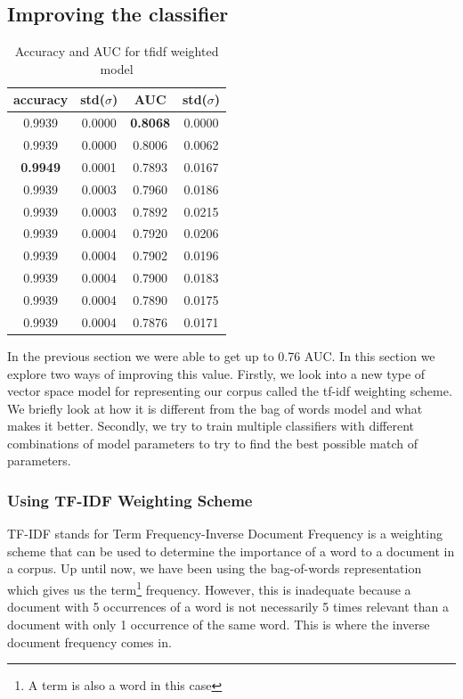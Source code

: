 \subsection{Improving the classifier}

\begin{table}
  \centering
  \begin{tabular}{cccc} \toprule
    accuracy        & std($\sigma$) & AUC             & std($\sigma$) \\ \midrule
    0.9939          & 0.0000        & \textbf{0.8068} & 0.0000 \\
    0.9939          & 0.0000        & 0.8006          & 0.0062 \\
    \textbf{0.9949} & 0.0001        & 0.7893          & 0.0167 \\
    0.9939          & 0.0003        & 0.7960          & 0.0186 \\
    0.9939          & 0.0003        & 0.7892          & 0.0215 \\ \midrule
    0.9939          & 0.0004        & 0.7920          & 0.0206 \\
    0.9939          & 0.0004        & 0.7902          & 0.0196 \\
    0.9939          & 0.0004        & 0.7900          & 0.0183 \\
    0.9939          & 0.0004        & 0.7890          & 0.0175 \\
    0.9939          & 0.0004        & 0.7876          & 0.0171 \\ \bottomrule
  \end{tabular}
    \caption{Accuracy and AUC for tfidf weighted model}
    \label{tab:tfidf-model-table}
\end{table}

In the previous section we were able to get up to 0.76 AUC\@. In this section we explore two ways of
improving this value. Firstly, we look into a new type of vector space model for representing our
corpus called the tf-idf weighting scheme. We briefly look at how it is different from the bag of
words model and what makes it better. Secondly, we try to train multiple classifiers with
different combinations of model parameters to try to find the best possible match of parameters.


\subsubsection{Using TF-IDF Weighting Scheme}
TF-IDF stands for Term Frequency-Inverse Document Frequency is a weighting scheme that can be used
to determine the importance of a word to a document in a corpus. Up until now, we have been using
the bag-of-words representation which gives us the term\footnote{A term is also a word in this case}
frequency. However, this is inadequate because a document with 5 occurrences of a word is not
necessarily 5 times relevant than a document with only 1 occurrence of the same word. This is where
the inverse document frequency comes in.

